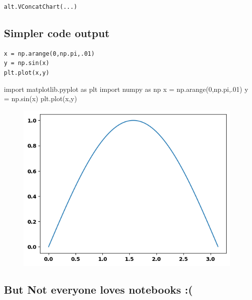 \documentclass[
  letterpaper,
  DIV=11,
  numbers=noendperiod]{scrartcl}
\newenvironment{Shaded}{\begin{snugshade}}{\end{snugshade}}
\newcommand{\DecValTok}[1]{\textcolor[rgb]{0.68,0.00,0.00}{#1}}
\newcommand{\FloatTok}[1]{\textcolor[rgb]{0.68,0.00,0.00}{#1}}
\newcommand{\ImportTok}[1]{\textcolor[rgb]{0.00,0.46,0.62}{#1}}
\newcommand{\NormalTok}[1]{\textcolor[rgb]{0.00,0.23,0.31}{#1}}
\newcommand{\OperatorTok}[1]{\textcolor[rgb]{0.37,0.37,0.37}{#1}}
\begin{document}
\begin{verbatim}
alt.VConcatChart(...)
\end{verbatim}

\hypertarget{simpler-code-output}{%
\subsection{Simpler code output}\label{simpler-code-output}}

\begin{verbatim}
x = np.arange(0,np.pi,.01)
y = np.sin(x)
plt.plot(x,y)
\end{verbatim}

\begin{Shaded}
\begin{Highlighting}[]
\ImportTok{import}\NormalTok{ matplotlib.pyplot }\ImportTok{as}\NormalTok{ plt}
\ImportTok{import}\NormalTok{ numpy }\ImportTok{as}\NormalTok{ np}
\NormalTok{x }\OperatorTok{=}\NormalTok{ np.arange(}\DecValTok{0}\NormalTok{,np.pi,}\FloatTok{.01}\NormalTok{)}
\NormalTok{y }\OperatorTok{=}\NormalTok{ np.sin(x)}
\NormalTok{plt.plot(x,y)}
\end{Highlighting}
\end{Shaded}

\begin{figure}[H]

{\centering \includegraphics{PresentationOfCommunicatingCode_files/figure-pdf/cell-3-output-1.png}

}

\end{figure}

\hypertarget{but-not-everyone-loves-notebooks}{%
\subsection{But Not everyone loves notebooks
:(}\label{but-not-everyone-loves-notebooks}}
\end{document}
